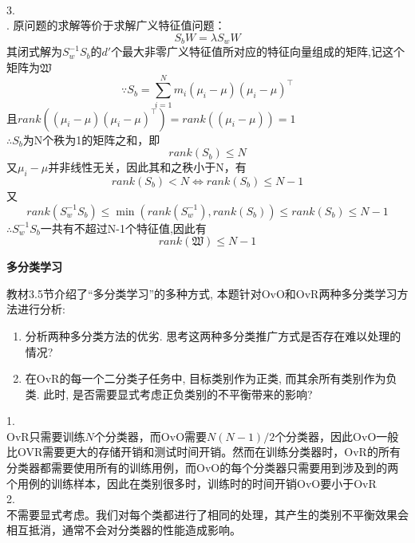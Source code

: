 \documentclass[answers]{exam}  %
\begin{document}
\begin{questions}
\begin{solution}
		\\3.\\.
		原问题的求解等价于求解广义特征值问题：$$S_bW=\lambda S_wW$$
		其闭式解为$S_w^{-1}S_b$的$d'$个最大非零广义特征值所对应的特征向量组成的矩阵,记这个矩阵为$\mathfrak W$\\
		$$\because S_b=\sum\limits^N_{i=1}m_i(\mu_i-\mu)(\mu_i-\mu)^\top$$
		且$rank((\mu_i-\mu)(\mu_i-\mu)^\top)= rank((\mu_i-\mu))=1$ \\
		$\therefore S_b$为N个秩为1的矩阵之和，即$$rank(S_b)\le N$$
		又$\mu_i-\mu$并非线性无关，因此其和之秩小于N，有\\
		$$rank(S_b)<N\iff rank(S_b)\le N-1$$
		又$$rank(S_w^{-1}S_b)\le \min(rank(S_w^{-1}),rank(S_b))\le rank(S_b)\le N-1 $$
		$\therefore S_w^{-1}S_b$一共有不超过N-1个特征值,因此有$$rank(\mathfrak W)\le N-1$$
	\end{solution}


\question [20] \textbf{多分类学习}

	教材3.5节介绍了“多分类学习”的多种方式, 本题针对OvO和OvR两种多分类学习方法进行分析:
\begin{enumerate}
    \item 分析两种多分类方法的优劣. 思考这两种多分类推广方式是否存在难以处理的情况?
    \item 在OvR的每一个二分类子任务中, 目标类别作为正类, 而其余所有类别作为负类. 此时, 是否需要显式考虑正负类别的不平衡带来的影响?
\end{enumerate}
	\begin{solution}
		1.\\
	    OvR只需要训练$N$个分类器，而OvO需要$N(N-1)/2$个分类器，因此OvO一般比OVR需要更大的存储开销和测试时间开销。然而在训练分类器时，OvR的所有分类器都需要使用所有的训练用例，而OvO的每个分类器只需要用到涉及到的两个用例的训练样本，因此在类别很多时，训练时的时间开销OvO要小于OvR\\
		2.\\
		不需要显式考虑。我们对每个类都进行了相同的处理，其产生的类别不平衡效果会相互抵消，通常不会对分类器的性能造成影响。
	\end{solution}

\end{questions}
\end{document}
